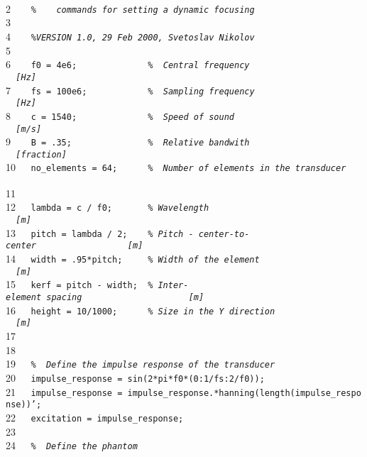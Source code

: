 \documentclass{manual}
\begin{document}
{\footnotesize{}\\
2{\tt~~~~}{\tt {\sl \%~~~~commands~for~setting~a~dynamic~focusing}}\\
3{\tt~~~~}{\tt }\\
4{\tt~~~~}{\tt {\sl \%VERSION~1.0,~29~Feb~2000,~Svetoslav~Nikolov}}\\
5{\tt~~~~}{\tt }\\
6{\tt~~~~}{\tt f0~=~4e6;~~~~~~~~~~~~~~{\sl \%~~Central~frequency~~~~~~~~~~~~~~~~~~~~~~~~[Hz]}}\\
7{\tt~~~~}{\tt fs~=~100e6;~~~~~~~~~~~~{\sl \%~~Sampling~frequency~~~~~~~~~~~~~~~~~~~~~~~[Hz]}}\\
8{\tt~~~~}{\tt c~=~1540;~~~~~~~~~~~~~~{\sl \%~~Speed~of~sound~~~~~~~~~~~~~~~~~~~~~~~~~~~[m/s]}}\\
9{\tt~~~~}{\tt B~=~.35;~~~~~~~~~~~~~~~{\sl \%~~Relative~bandwith~~~~~~~~~~~~~~~~~~~~~~~~[fraction]}}\\
10{\tt~~~}{\tt no\_elements~=~64;~~~~~~{\sl \%~~Number~of~elements~in~the~transducer~~~~~}}\\
11{\tt~~~}{\tt }\\
12{\tt~~~}{\tt lambda~=~c~/~f0;~~~~~~~{\sl \%~Wavelength~~~~~~~~~~~~~~~~~~~~~~~~~~~~~~~~[m]}}\\
13{\tt~~~}{\tt pitch~=~lambda~/~2;~~~~{\sl \%~Pitch~-~center-to-center~~~~~~~~~~~~~~~~~~[m]}}\\
14{\tt~~~}{\tt width~=~.95*pitch;~~~~~{\sl \%~Width~of~the~element~~~~~~~~~~~~~~~~~~~~~~[m]}}\\
15{\tt~~~}{\tt kerf~=~pitch~-~width;~~{\sl \%~Inter-element~spacing~~~~~~~~~~~~~~~~~~~~~[m]}}\\
16{\tt~~~}{\tt height~=~10/1000;~~~~~~{\sl \%~Size~in~the~Y~direction~~~~~~~~~~~~~~~~~~~[m]}}\\
17{\tt~~~}{\tt ~}\\
18{\tt~~~}{\tt ~}\\
19{\tt~~~}{\tt {\sl \%~~Define~the~impulse~response~of~the~transducer}}\\
20{\tt~~~}{\tt impulse\_response~=~sin(2*pi*f0*(0:1/fs:2/f0));}\\
21{\tt~~~}{\tt impulse\_response~=~impulse\_response.*hanning(length(impulse\_response))';}\\
22{\tt~~~}{\tt excitation~=~impulse\_response;}\\
23{\tt~~~}{\tt }\\
24{\tt~~~}{\tt {\sl \%~~Define~the~phantom}}\\
}
\end{document}
